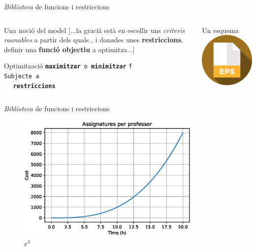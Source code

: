 \documentclass[twocolumn]{beamer}
\begin{document}
\begin{frame}{\textit{Biblioteca} de funcions i restriccions}
\begin{columns}[t]
	\begin{column}{.5\textwidth}
		\begin{block}{Una noció del model}
			[...la gracià està en escollir uns \emph{criteris raonables}
			a partir dels quals , i donades unes \textbf{restriccions}, definir una \textbf{funció objectiu} a optimitza...]
		\end{block}
		
		\begin{block}{Optimització}
			\texttt{\textbf{maximitzar} o \textbf{minimitzar}} \texttt{f}
			\\ 
			\texttt{Subjecte a}
			\\
			$\quad $ \texttt{\textbf{restriccions}}
		\end{block}
	\end{column}
	\begin{column}{.5\textwidth}
		\begin{block}{Un esquema}
			\includegraphics[width=5cm]{eps}
		\end{block}
	\end{column}
\end{columns}
\end{frame}




\begin{frame}{\textit{Biblioteca} de funcions i restriccions}
\begin{figure}
	\includegraphics[width=9cm]{Assignatures}
	\caption{$x^3$}
\end{figure}
\end{frame}
\end{document}
